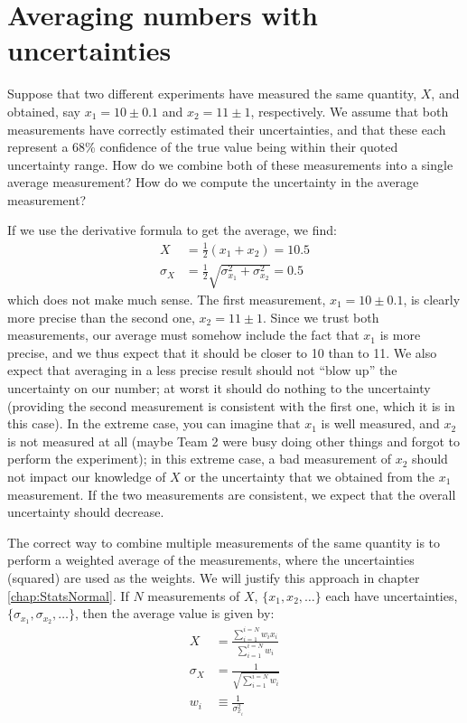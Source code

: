 \clearpage
\section{Averaging numbers with uncertainties}
Suppose that two different experiments have measured the same quantity, $X$, and obtained, say $x_1=10 \pm 0.1$ and $x_2=11 \pm 1$, respectively. We assume that both measurements have correctly estimated their uncertainties, and that these each represent a 68\% confidence of the true value being within their quoted uncertainty range. How do we combine both of these measurements into a single average measurement? How do we compute the uncertainty in the average measurement?

If we use the derivative formula to get the average, we find:
\begin{align*}
X &= \frac{1}{2} (x_1+x_2)=10.5\\
\sigma_{X} &= \frac{1}{2}\sqrt{\sigma_{x_1}^2+\sigma_{x_2}^2}=0.5
\end{align*}
which does not make much sense. The first measurement, $x_1=10 \pm 0.1$, is clearly more precise than the second one, $x_2=11 \pm 1$. Since we trust both measurements, our average must somehow include the fact that $x_1$ is more precise, and we thus expect that it should be closer to 10 than to 11. We also expect that averaging in a less precise result should not ``blow up'' the uncertainty on our number; at worst it should do nothing to the uncertainty (providing the second measurement is consistent with the first one, which it is in this case). In the extreme case, you can imagine that $x_1$ is well measured, and $x_2$ is not measured at all (maybe Team 2 were busy doing other things and forgot to perform the experiment); in this extreme case, a bad measurement of $x_2$ should not impact our knowledge of $X$ or the uncertainty that we obtained from the $x_1$ measurement. If the two measurements are consistent, we expect that the overall uncertainty should decrease. 

The correct way to combine multiple measurements of the same quantity is to perform a weighted average of the measurements, where the uncertainties (squared) are used as the weights. We will justify this approach in chapter \ref{chap:StatsNormal}. If $N$ measurements of $X$, $\{x_1, x_2 ,\dots\}$ each have uncertainties, $\{\sigma_{x_1}, \sigma_{x_2} ,\dots\}$, then the average value is given by:
\begin{align*}
X &= \frac{\sum_{i=1}^{i=N}w_ix_i}{\sum_{i=1}^{i=N}w_i}\\
\sigma_{X} &= \frac{1}{\sqrt{\sum_{i=1}^{i=N}w_i}}\\
w_i&\equiv\frac{1}{\sigma_{x_i}^2}
\end{align*}

